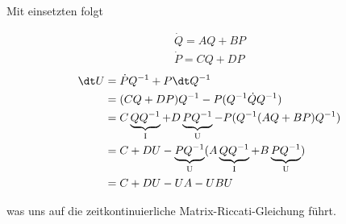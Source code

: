 Mit einsetzten folgt

\begin{align*}
    \dot{Q} = AQ + BP \\
    \dot{P} = CQ + DP
\end{align*}
\begin{equation}
    \begin{split}
        \dt U   &= \dot{P} Q^{-1} + P \dt Q^{-1} \\
        &= (CQ + DP) Q^{-1} - P (Q^{-1} \dot{Q} Q^{-1}) \\
        &= C\underbrace{QQ^{-1}}_\text{I} + D\underbrace{PQ^{-1}}_\text{U} - P(Q^{-1} (AQ + BP) Q^{-1}) \\
        &= C + DU - \underbrace{PQ^{-1}}_\text{U}(A\underbrace{QQ^{-1}}_\text{I} + B\underbrace{PQ^{-1}}_\text{U}) \\
        &= C  + DU - UA - UBU
    \end{split}
\end{equation}

was uns auf die zeitkontinuierliche Matrix-Riccati-Gleichung führt.

